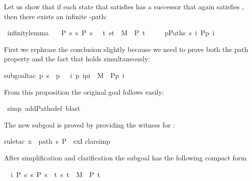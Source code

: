 \begin{isabellebody}
\begin{isamarkuptext}
Let us show that if each state  that satisfies 
has a successor that again satisfies , then there exists an infinite -path:%
\end{isamarkuptext}%
\ infinity{\isacharunderscore}lemma{\isacharcolon}\isanewline
\ \ {\isachardoublequote}{\isasymlbrakk}\ P\ s{\isacharsemicolon}\ {\isasymforall}s{\isachardot}\ P\ s\ {\isasymlongrightarrow}\ {\isacharparenleft}{\isasymexists}\ t{\isachardot}\ {\isacharparenleft}s{\isacharcomma}t{\isacharparenright}\ {\isasymin}\ M\ {\isasymand}\ P\ t{\isacharparenright}\ {\isasymrbrakk}\ {\isasymLongrightarrow}\isanewline
\ \ \ {\isasymexists}p{\isasymin}Paths\ s{\isachardot}\ {\isasymforall}i{\isachardot}\ P{\isacharparenleft}p\ i{\isacharparenright}{\isachardoublequote}%
\begin{isamarkuptxt}%
\noindent
First we rephrase the conclusion slightly because we need to prove both the path property
and the fact that  holds simultaneously:%
\end{isamarkuptxt}%
subgoal{\isacharunderscore}tac\ {\isachardoublequote}{\isasymexists}p{\isachardot}\ s\ {\isacharequal}\ p\ {}\ {\isasymand}\ {\isacharparenleft}{\isasymforall}i{\isachardot}\ {\isacharparenleft}p\ i{\isacharcomma}p{\isacharparenleft}i{\isacharplus}{}{\isacharparenright}{\isacharparenright}\ {\isasymin}\ M\ {\isasymand}\ P{\isacharparenleft}p\ i{\isacharparenright}{\isacharparenright}{\isachardoublequote}{\isacharparenright}%
\begin{isamarkuptxt}%
\noindent
From this proposition the original goal follows easily:%
\end{isamarkuptxt}%
\ simp\ add{\isacharcolon}Paths{\isacharunderscore}def{\isacharcomma}\ blast{\isacharparenright}%
\begin{isamarkuptxt}%
\noindent
The new subgoal is proved by providing the witness  for :%
\end{isamarkuptxt}%
rule{\isacharunderscore}tac\ x\ {\isacharequal}\ {\isachardoublequote}path\ s\ P{\isachardoublequote}\ \ exI{\isacharparenright}\isanewline
{}clarsimp{\isacharparenright}%
\begin{isamarkuptxt}%
\noindent
After simplification and clarification the subgoal has the following compact form
\begin{isabelle}
\ \ {\isasymAnd}i{\isachardot}\ {\isasymlbrakk}P\ s{\isacharsemicolon}\ {\isasymforall}s{\isachardot}\ P\ s\ {\isasymlongrightarrow}\ {\isacharparenleft}{\isasymexists}t{\isachardot}\ {\isacharparenleft}s{\isacharcomma}\ t{\isacharparenright}\ {\isasymin}\ M\ {\isasymand}\ P\ t{\isacharparenright}{\isasymrbrakk}\isanewline

\end{isabelle}
\end{isamarkuptxt}
\end{isabellebody}
